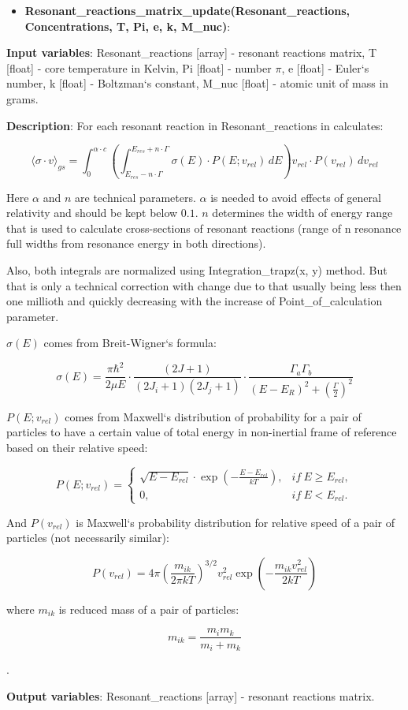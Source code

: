 \documentclass[a4paper,12pt]{article}
\newcommand{\namefunction}[4]{
  \begin{itemize}
    \item \textbf{#1}:
  \end{itemize}
  
  \textbf{Input variables}: #2.
  
  \textbf{Description}: #3.
  
  \textbf{Output variables}: #4.
}
\begin{document}
\namefunction{Resonant\_reactions\_matrix\_update(Resonant\_reactions, Concentrations, T, Pi, e, k, M\_nuc)}{Resonant\_reactions [array] - resonant reactions matrix, T [float] - core temperature in Kelvin, Pi [float] - number $\pi$, e [float] - Euler`s number, k [float] - Boltzman`s constant, M\_nuc [float] - atomic unit of mass in grams}{For each resonant reaction in Resonant\_reactions in calculates:

\[\langle \sigma \cdot v \rangle_{gs} = \int_{0}^{\alpha \cdot c} \left( \int_{E_{res} - n \cdot \Gamma}^{E_{res} + n \cdot \Gamma} \sigma(E) \cdot P(E; v_{rel}) \, dE \right) v_{rel} \cdot P(v_{rel}) \, dv_{rel}\]

Here $\alpha$ and $n$ are technical parameters. $\alpha$ is needed to avoid effects of general relativity and should be kept below $0.1$. $n$ determines the width of energy range that is used to calculate cross-sections of resonant reactions (range of n resonance full widths from resonance energy in both directions).

Also, both integrals are normalized using Integration\_trapz(x, y) method. But that is only a  technical correction with change due to that usually being less then one millioth and quickly decreasing with the increase of Point\_of\_calculation parameter.

$\sigma(E)$ comes from Breit-Wigner`s formula:

\[\sigma(E) = \frac{\pi \hbar^2}{2 \mu E} \cdot \frac{(2J + 1)}{(2J_{i} + 1)(2J_{j} + 1)} \cdot \frac{\Gamma_a \Gamma_b}{(E - E_R)^2 + \left( \frac{\Gamma}{2} \right)^2}\]

$P(E; v_{rel})$ comes from Maxwell`s distribution of probability for a pair of particles to have a certain value of total energy in non-inertial frame of reference based on their relative speed:

\[P(E; v_{rel}) = 
\left\{
\begin{array}{ll}
\sqrt{E - E_{rel}} \cdot \exp\left(-\frac{E - E_{rel}}{k T}\right), & if \ E \geq E_{rel}, \\
0, & if \ E < E_{rel}.
\end{array}
\right.\]

And $P(v_{rel})$ is Maxwell`s probability distribution for relative speed of a pair of particles (not necessarily similar):

\[P(v_{rel}) = 4 \pi \left( \frac{m_{ik}}{2 \pi k T} \right)^{3/2} v_{rel}^2 \exp \left( -\frac{m_{ik} v_{rel}^2}{2 k T} \right)\]

where $m_{ik}$ is reduced mass of a pair of particles:

\[m_{ik} = \frac{m_i m_k}{m_i + m_k}\]

}{Resonant\_reactions [array] - resonant reactions matrix}
\end{document}

